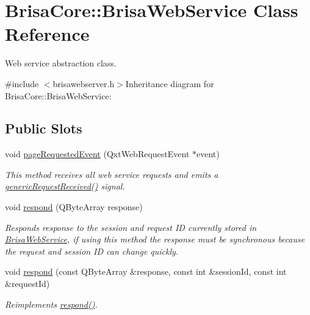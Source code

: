 \hypertarget{classBrisaCore_1_1BrisaWebService}{
\section{BrisaCore::BrisaWebService Class Reference}
\label{classBrisaCore_1_1BrisaWebService}
}


Web service abstraction class.  


{\ttfamily \#include $<$brisawebserver.h$>$}Inheritance diagram for BrisaCore::BrisaWebService:\subsection*{Public Slots}
\begin{DoxyCompactItemize}
\item 
void \hyperlink{classBrisaCore_1_1BrisaWebService_afebcc6819b39a28ddd06bb78ec7d26a0}{pageRequestedEvent} (QxtWebRequestEvent $\ast$event)
\begin{DoxyCompactList}\small\item\em This method receives all web service requests and emits a \hyperlink{classBrisaCore_1_1BrisaWebService_ad94a4a9cd45a90dc56559ac86728c61b}{genericRequestReceived()} signal. \item\end{DoxyCompactList}\item 
void \hyperlink{classBrisaCore_1_1BrisaWebService_a4065f685234edf9f4c1bda00549060c7}{respond} (QByteArray response)
\begin{DoxyCompactList}\small\item\em Responds {\itshape response\/} to the session and request ID currently stored in \hyperlink{classBrisaCore_1_1BrisaWebService}{BrisaWebService}, if using this method the response must be synchronous because the request and session ID can change quickly. \item\end{DoxyCompactList}\item 
void \hyperlink{classBrisaCore_1_1BrisaWebService_ada638bec49ea1dcc3978120529265b60}{respond} (const QByteArray \&response, const int \&sessionId, const int \&requestId)
\begin{DoxyCompactList}\small\item\em Reimplements \hyperlink{classBrisaCore_1_1BrisaWebService_a4065f685234edf9f4c1bda00549060c7}{respond()}. \item\end{DoxyCompactList}\item 

\end{DoxyCompactItemize}

